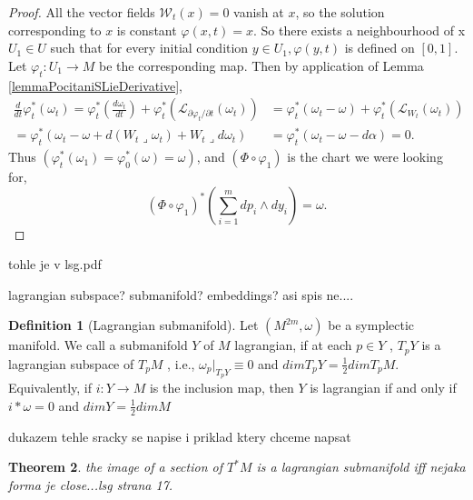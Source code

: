 \documentclass{article}
\newtheorem{theorem}{Theorem}
\theoremstyle{definition}
\newtheorem{definition}[theorem]{Definition}
\begin{document}
\begin{proof}
    All the vector fields $\mathcal{W}_t(x) = 0$ vanish at $x$, so the solution corresponding to $x$ is constant $\varphi(x,t) = x$. So there exists a neighbourhood of x $U_1 \in U$ such that for every initial condition $y \in U_1, \varphi(y,t)$ is defined on $[0,1]$. Let $\varphi_t:U_1 \rightarrow M$ be the corresponding map. Then by application of Lemma \ref{lemmaPocitaniSLieDerivative},
    \begin{equation*}
        \begin{split}
            \frac{d}{dt} \varphi_t^* (\omega_t) = \varphi_t^* \left( \frac{d\omega_t}{dt} \right) 
            + \varphi_t^* \left( \mathcal{L}_{\partial \varphi_t / \partial t} (\omega_t) \right)
            &= \varphi_t^* (\omega_t - \omega) + \varphi_t^* \left( \mathcal{L}_{W_t} (\omega_t) \right) \\ 
            = \varphi_t^* (\omega_t - \omega + d(W_t \lrcorner \omega_t) + W_t \lrcorner d\omega_t) 
            &= \varphi_t^* (\omega_t - \omega - d\alpha) = 0.
        \end{split}
    \end{equation*}
    Thus $(\varphi_t^*(\omega_1) = \varphi_0^*(\omega) = \omega)$, and $(\Phi \circ \varphi_1)$ is the chart we were looking for,
    \begin{equation*}
        (\Phi \circ \varphi_1)^* \left( \sum_{i=1}^m dp_i \wedge dy_i \right) = \omega.
    \end{equation*}

\end{proof}

tohle je v lsg.pdf

lagrangian subspace? submanifold? embeddings? asi spis ne....

\begin{definition}[Lagrangian submanifold]
    Let $(M^{2m},\omega)$ be a symplectic manifold. We call a submanifold $Y$ of $M$ lagrangian, if at each $p \in Y$ , $T_pY$ is a lagrangian
    subspace of $T_pM$ , i.e., $\omega_p|_{T_pY} \equiv 0$ and $dim T_pY = \frac{1}{2} dim T_pM$. 
    Equivalently, if $i : Y \rightarrow M$ is the inclusion map, then $Y$ is lagrangian if and only if $i*\omega = 0$ and $dim Y = \frac{1}{2} dim M$ 
    
\end{definition}

dukazem tehle sracky se napise i priklad ktery chceme napsat 
\begin{theorem}
    the image of a section of $T^*M$ is a lagrangian submanifold iff nejaka forma je close...lsg strana 17.
\end{theorem}
\end{document}
